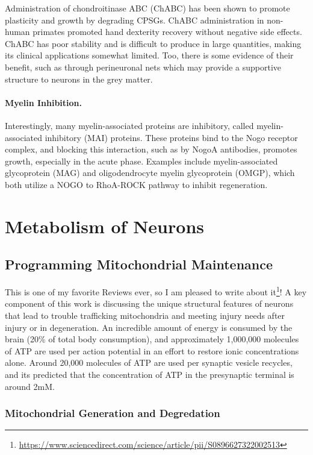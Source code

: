 \documentclass[12pt]{report}
\begin{document}
Administration of chondroitinase ABC (ChABC) has been shown to promote plasticity and growth by degrading CPSGs. ChABC administration in non-human primates promoted hand dexterity recovery without negative side effects. ChABC has poor stability and is difficult to produce in large quantities, making its clinical applications somewhat limited. Too, there is some evidence of their benefit, such as through perineuronal nets which may provide a supportive structure to neurons in the grey matter.\newline  


\subsubsection{Myelin Inhibition.}

Interestingly, many myelin-associated proteins are inhibitory, called myelin-associated inhibitory (MAI) proteins. These proteins bind to the Nogo receptor complex, and blocking this interaction, such as by NogoA antibodies, promotes growth, especially in the acute phase. Examples include myelin-associated glycoprotein (MAG) and oligodendrocyte myelin glycoprotein (OMGP), which both utilize a NOGO to RhoA-ROCK pathway to inhibit regeneration. 


\chapter{Metabolism of Neurons}

\section{Programming Mitochondrial Maintenance}

This is one of my favorite Reviews ever, so I am pleased to write about it\footnote{\url{https://www.sciencedirect.com/science/article/pii/S0896627322002513}}! A key component of this work is discussing the unique structural features of neurons that lead to trouble trafficking mitochondria and meeting injury needs after injury or in degeneration. An incredible amount of energy is consumed by the brain (20\% of total body consumption), and approximately 1,000,000 molecules of ATP are used per action potential in an effort to restore ionic concentrations alone. Around 20,000 molecules of ATP are used per synaptic vesicle recycles, and its predicted that the concentration of ATP in the presynaptic terminal is around 2mM.

\subsection{Mitochondrial Generation and Degredation}
\end{document}
